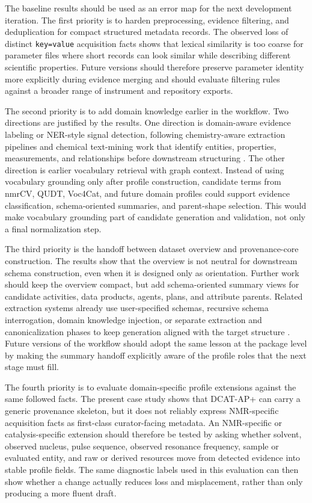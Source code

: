 The baseline results should be used as an error map for the next development iteration.
The first priority is to harden preprocessing, evidence filtering, and deduplication for compact structured metadata records.
The observed loss of distinct \texttt{key=value} acquisition facts shows that lexical similarity is too coarse for parameter files where short records can look similar while describing different scientific properties.
Future versions should therefore preserve parameter identity more explicitly during evidence merging and should evaluate filtering rules against a broader range of instrument and repository exports.

The second priority is to add domain knowledge earlier in the workflow.
Two directions are justified by the results.
One direction is domain-aware evidence labeling or \ac{NER}-style signal detection, following chemistry-aware extraction pipelines and chemical text-mining work that identify entities, properties, measurements, and relationships before downstream structuring \cite{swain2016chemdataextractor,zhang2024chemicaltextmining}.
The other direction is earlier vocabulary retrieval with graph context.
Instead of using vocabulary grounding only after profile construction, candidate terms from \ac{nmrCV}, \ac{QUDT}, Voc4Cat, and future domain profiles could support evidence classification, schema-oriented summaries, and parent-shape selection.
This would make vocabulary grounding part of candidate generation and validation, not only a final normalization step.

The third priority is the handoff between dataset overview and provenance-core construction.
The results show that the overview is not neutral for downstream schema construction, even when it is designed only as orientation.
Further work should keep the overview compact, but add schema-oriented summary views for candidate activities, data products, agents, plans, and attribute parents.
Related extraction systems already use user-specified schemas, recursive schema interrogation, domain knowledge injection, or separate extraction and canonicalization phases to keep generation aligned with the target structure \cite{walls2025catminer,caufield2024spires,zhang2024edc}.
Future versions of the workflow should adopt the same lesson at the package level by making the summary handoff explicitly aware of the profile roles that the next stage must fill.

The fourth priority is to evaluate domain-specific profile extensions against the same followed facts.
The present case study shows that \ac{DCAT-AP+} can carry a generic provenance skeleton, but it does not reliably express \ac{NMR}-specific acquisition facts as first-class curator-facing metadata.
An \ac{NMR}-specific or catalysis-specific extension should therefore be tested by asking whether solvent, observed nucleus, pulse sequence, observed resonance frequency, sample or evaluated entity, and raw or derived resources move from detected evidence into stable profile fields.
The same diagnostic labels used in this evaluation can then show whether a change actually reduces loss and misplacement, rather than only producing a more fluent draft.

